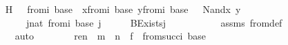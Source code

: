 \begin{isabellebody}
\isanewline
\ \ \ \ \ \ \isamarkupfalse%
\ H{\isacharcolon}{\kern0pt}\ {\isachardoublequoteopen}{\isasymphi}\ {\isasymin}\ {\isasymDelta}{}{\isacharunderscore}{\kern0pt}from{\isacharcircum}{\kern0pt}i\ {\isacharparenleft}{\kern0pt}{\isasymDelta}{}{\isacharunderscore}{\kern0pt}base{\isacharparenright}{\kern0pt}\ {\isasymor}\ {\isacharparenleft}{\kern0pt}{\isasymexists}x{\isasymin}{\isasymDelta}{}{\isacharunderscore}{\kern0pt}from{\isacharcircum}{\kern0pt}i\ {\isacharparenleft}{\kern0pt}{\isasymDelta}{}{\isacharunderscore}{\kern0pt}base{\isacharparenright}{\kern0pt}{\isachardot}{\kern0pt}\ {\isasymexists}y{\isasymin}{\isasymDelta}{}{\isacharunderscore}{\kern0pt}from{\isacharcircum}{\kern0pt}i\ {\isacharparenleft}{\kern0pt}{\isasymDelta}{}{\isacharunderscore}{\kern0pt}base{\isacharparenright}{\kern0pt}{\isachardot}{\kern0pt}\ {\isasymphi}\ {\isacharequal}{\kern0pt}\ Nand{\isacharparenleft}{\kern0pt}x{\isacharcomma}{\kern0pt}\ y{\isacharparenright}{\kern0pt}{\isacharparenright}{\kern0pt}\ {\isasymor}\isanewline
\ \ \ \ \ \ \ \ \ \ \ \ {\isacharparenleft}{\kern0pt}{\isasymexists}j{\isasymin}nat{\isachardot}{\kern0pt}\ {\isasymexists}{\isasympsi}{\isasymin}{\isasymDelta}{}{\isacharunderscore}{\kern0pt}from{\isacharcircum}{\kern0pt}i\ {\isacharparenleft}{\kern0pt}{\isasymDelta}{}{\isacharunderscore}{\kern0pt}base{\isacharparenright}{\kern0pt}{\isachardot}{\kern0pt}\ j\ {\isasymnoteq}\ {}\ {\isasymand}\ {\isasymphi}\ {\isacharequal}{\kern0pt}\ BExists{\isacharprime}{\kern0pt}{\isacharparenleft}{\kern0pt}j{\isacharcomma}{\kern0pt}\ {\isasympsi}{\isacharparenright}{\kern0pt}{\isacharparenright}{\kern0pt}{\isachardoublequoteclose}\isanewline
\ \ \ \ \ \ \ \ \isamarkupfalse%
\ assms{}\ {\isasymDelta}{}{\isacharunderscore}{\kern0pt}from{\isacharunderscore}{\kern0pt}def\isanewline
\ \ \ \ \ \ \ \ \isamarkupfalse%
\ auto\isanewline
\isanewline
\ \ \ \ \ \ \isamarkupfalse%
\ {\isachardoublequoteopen}ren{\isacharparenleft}{\kern0pt}{\isasymphi}{\isacharparenright}{\kern0pt}\ {\isacharbackquote}{\kern0pt}\ m\ {\isacharbackquote}{\kern0pt}\ n\ {\isacharbackquote}{\kern0pt}\ f\ {\isasymin}\ {\isasymDelta}{}{\isacharunderscore}{\kern0pt}from{\isacharcircum}{\kern0pt}succ{\isacharparenleft}{\kern0pt}i{\isacharparenright}{\kern0pt}\ {\isacharparenleft}{\kern0pt}{\isasymDelta}{}{\isacharunderscore}{\kern0pt}base{\isacharparenright}{\kern0pt}{\isachardoublequoteclose}\ \isanewline

\end{isabellebody}

